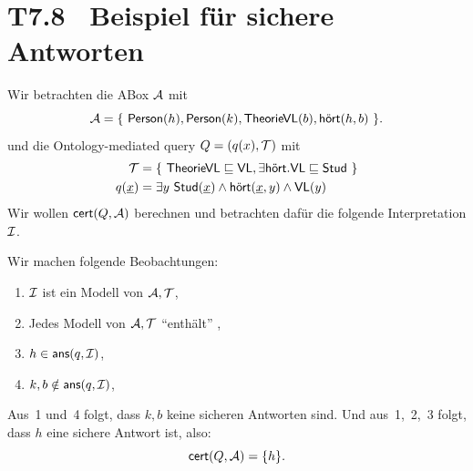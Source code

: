 \documentclass[fontsize=11pt, twoside=false, numbers=autoenddot]{scrbook}
\begin{document}
\section*{T7.8~ Beispiel für sichere Antworten}

Wir betrachten die ABox $\mathcal{A}$ mit
%
\[\mathcal{A} = \{\ \textsf{Person}(h), \textsf{Person}(k), \textsf{TheorieVL}(b),
\textsf{hört}(h,b)\ \}.\]
%
und die Ontology-mediated query $Q=(q(x),\mathcal{T})$ mit
%
\begin{align*}
  \mathcal{T} & = \{\ \textsf{TheorieVL}\sqsubseteq \textsf{VL}, \exists
  \textsf{hört}.\textsf{VL}\sqsubseteq \textsf{Stud}\ \} \\
  q(\underline x) & = \exists y~\textsf{Stud}(\underline x)\wedge
  \textsf{hört}(\underline x,y)\wedge
  \textsf{VL}(y)
\end{align*}
%
Wir wollen $\textsf{cert}(Q,\mathcal{A})$ berechnen und betrachten dafür die
folgende Interpretation $\mathcal{I}$.
%
\begin{center}
\end{center}
%
Wir machen folgende Beobachtungen: 
%
\begin{enumerate}

  \item $\mathcal{I}$ ist ein Modell von $\mathcal{A},\mathcal{T}$,

  \item Jedes Modell von $\mathcal{A},\mathcal{T}$ ``enthält'' \Imc,

  \item $h\in\textsf{ans}(q,\mathcal{I})$,

  \item $k,b\notin\textsf{ans}(q,\mathcal{I})$,

\end{enumerate}
%
Aus~1 und~4 folgt, dass $k,b$ keine sicheren Antworten sind. Und
aus~1,~2,~3 folgt, dass $h$ eine sichere Antwort ist, also:  
%
\[\textsf{cert}(Q,\mathcal{A})=\{h\}.\]
\end{document}
